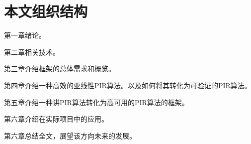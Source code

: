 \section{本文组织结构}

第一章绪论。

第二章相关技术。

第三章介绍框架的总体需求和概览。

第四章介绍一种高效的亚线性PIR算法。以及如何将其转化为可验证的PIR算法。

第五章介绍一种讲PIR算法转化为高可用的PIR算法的框架。

第六章介绍在实际项目中的应用。

第六章总结全文，展望该方向未来的发展。